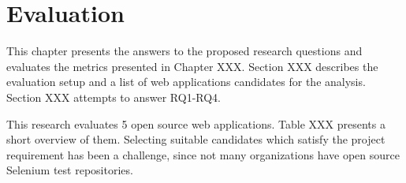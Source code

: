 \chapter{Evaluation} %

\label{Chapter6} %

This chapter presents the answers to the proposed research questions and evaluates the metrics presented in Chapter XXX. Section XXX describes the evaluation setup and a list of web applications candidates for the analysis. 
Section XXX attempts to answer RQ1-RQ4. 

This research evaluates 5 open source web applications. Table XXX presents a short overview of them.  Selecting suitable candidates which satisfy the project requirement has been a challenge, since not many organizations have open source Selenium test repositories. 



